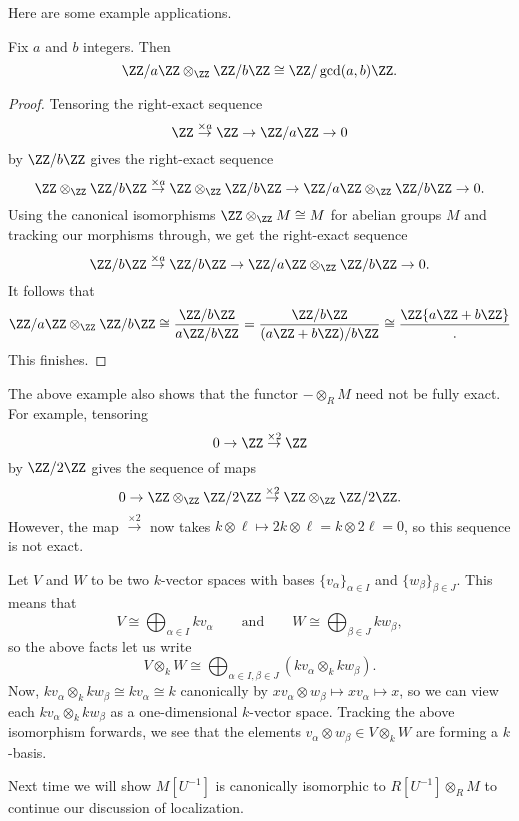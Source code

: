 \documentclass[../notes.tex]{subfiles}
\begin{document}

Here are some example applications.
\begin{exe} \label{exe:zmodtensors}
	Fix $a$ and $b$ integers. Then
	\[\ZZ/a\ZZ\otimes_\ZZ\ZZ/b\ZZ\cong\ZZ/\gcd(a,b)\ZZ.\]
\end{exe}
\begin{proof}
	Tensoring the right-exact sequence
	\[\ZZ\stackrel{\times a}\to\ZZ\to\ZZ/a\ZZ\to0\]
	by $\ZZ/b\ZZ$ gives the right-exact sequence
	\[\ZZ\otimes_\ZZ\ZZ/b\ZZ\stackrel{\times a}\to\ZZ\otimes_\ZZ\ZZ/b\ZZ\to\ZZ/a\ZZ\otimes_\ZZ\ZZ/b\ZZ\to0.\]
	Using the canonical isomorphisms $\ZZ\otimes_\ZZ M\cong M$ for abelian groups $M$ and tracking our morphisms through, we get the right-exact sequence
	\[\ZZ/b\ZZ\stackrel{\times a}\to\ZZ/b\ZZ\to\ZZ/a\ZZ\otimes_\ZZ\ZZ/b\ZZ\to0.\]
	It follows that
	\[\ZZ/a\ZZ\otimes_\ZZ\ZZ/b\ZZ\cong\frac{\ZZ/b\ZZ}{a\ZZ/b\ZZ}=\frac{\ZZ/b\ZZ}{(a\ZZ+b\ZZ)/b\ZZ}\cong\frac\ZZ{a\ZZ+b\ZZ}.\]
	This finishes.
\end{proof}
\begin{remark}
	The above example also shows that the functor $-\otimes_RM$ need not be fully exact. For example, tensoring
	\[0\to\ZZ\stackrel{\times2}\to\ZZ\]
	by $\ZZ/2\ZZ$ gives the sequence of maps
	\[0\to\ZZ\otimes_\ZZ\ZZ/2\ZZ\stackrel{\times2}\to\ZZ\otimes_\ZZ\ZZ/2\ZZ.\]
	However, the map $\stackrel{\times2}\to$ now takes $k\otimes\ell\mapsto2k\otimes\ell=k\otimes2\ell=0$, so this sequence is not exact.
\end{remark}
\begin{example} \label{ex:tensorvecspaces}
	Let $V$ and $W$ to be two $k$-vector spaces with bases $\{v_\alpha\}_{\alpha\in I}$ and $\{w_\beta\}_{\beta\in J}$. This means that
	\[V\cong\bigoplus_{\alpha\in I}kv_\alpha\qquad\text{and}\qquad W\cong\bigoplus_{\beta\in J}kw_\beta,\]
	so the above facts let us write
	\[V\otimes_kW\cong\bigoplus_{\alpha\in I,\beta\in J}(kv_\alpha\otimes_kkw_\beta).\]
	Now, $kv_\alpha\otimes_kkw_\beta\cong kv_\alpha\cong k$ canonically by $xv_\alpha\otimes w_\beta\mapsto xv_\alpha\mapsto x$, so we can view each $kv_\alpha\otimes_kkw_\beta$ as a one-dimensional $k$-vector space. Tracking the above isomorphism forwards, we see that the elements $v_\alpha\otimes w_\beta\in V\otimes_kW$ are forming a $k$-basis.
\end{example}
Next time we will show $M\left[U^{-1}\right]$ is canonically isomorphic to $R\left[U^{-1}\right]\otimes_RM$ to continue our discussion of localization.
\end{document}
